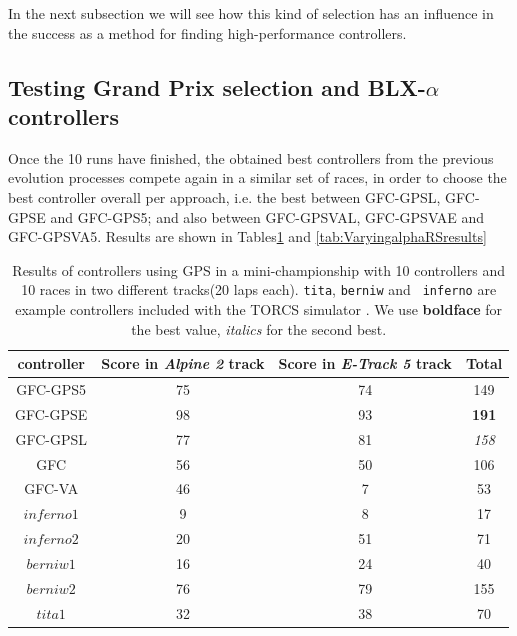 \documentclass[10pt,journal,compsoc]{IEEEtran}
\begin{document}
 In the next subsection we
will see how this kind of selection has an influence in the success as
a method for finding high-performance controllers.



\subsection{Testing Grand Prix selection and BLX-$\alpha$ controllers}


Once the 10 runs have finished, the obtained best controllers from the
previous evolution processes compete again in a similar set of races,
in order to choose the best controller overall per approach, i.e. the
best between {\sf GFC-GPSL}, {\sf GFC-GPSE} and {\sf GFC-GPS5}; and also between
{\sf GFC-GPSVAL}, {\sf GFC-GPSVAE} and {\sf GFC-GPSVA5}. 
Results are shown in Tables\ref{tab:RSresults} and \ref{tab:VaryingalphaRSresults}

\begin{table}[ht]
	\centering
	{\scriptsize
		\caption{ Results of controllers using GPS in a mini-championship with 10 controllers and 10
			races in two different tracks(20 laps each). {\tt tita}, {\tt berniw} and {\tt
				inferno} are example controllers included with the TORCS
			simulator \cite{torcs4}. We use {\bf boldface}
                      for the best value, {\em italics} for the second
                    best. }
		{
			\begin{tabular}{|c|c|c||c|}
				\hline
				controller&Score in \textit{Alpine 2} track &Score in \textit{E-Track 5} track &Total\\
				\hline
				\hline
				
			{\sf GFC-GPS5}\cite{DBLP:conf/cig/SalemMG19}&	75	&74&	149\\
			{\sf GFC-GPSE}&	98	&93&	{\bf 191}\\
			{\sf GFC-GPSL}\cite{DBLP:conf/cig/SalemMG19}&	77	&81&	{\em 158}\\
			{\sf GFC} \cite{salem_cig2018}	&	56	&50&	106\\
			{\sf GFC-VA}\cite{DBLP:conf/cig/SalemMG19}	&	46	&7&		53\\
			$inferno1$&	9	&8&		17\\
			$inferno2$&		20	&51&	71\\
			$berniw1$&	16	&24&	40\\
			$berniw2$&	76	&79&	155\\
			$tita1$&32	&38&	70\\		
				\hline
				
			\end{tabular}
		}\label{tab:RSresults}
	}
\end{table}
%
\end{document}
